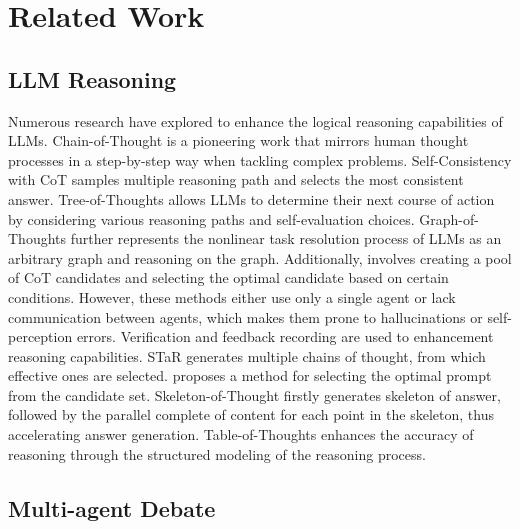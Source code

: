 \section{Related Work}
\label{sec:related-work}

\subsection{LLM Reasoning}

Numerous research have explored to enhance the logical reasoning capabilities of LLMs. Chain-of-Thought \cite{wei2023chainofthought} is a pioneering work that mirrors human thought processes in a step-by-step way when tackling complex problems. Self-Consistency with CoT \cite{wang2023selfconsistency} samples multiple reasoning path and selects the most consistent answer. Tree-of-Thoughts \cite{yao2024tree} allows LLMs to determine their next course of action by considering various reasoning paths and self-evaluation choices. Graph-of-Thoughts \cite{besta2024graph} further represents the nonlinear task resolution process of LLMs as an arbitrary graph and reasoning on the graph. 
Additionally, \cite{shum2023automatic} involves creating a pool of CoT candidates and selecting the optimal candidate based on certain conditions. However, these methods either use only a single agent or lack communication between agents, which makes them prone to hallucinations or self-perception errors.
Verification \cite{lightman2023lets} and feedback recording are used to enhancement reasoning capabilities. 
STaR \cite{eric2022star} generates multiple chains of thought, from which effective ones are selected.
\cite{zhou2022large} proposes a method for selecting the optimal prompt from the candidate set. 
Skeleton-of-Thought \cite{ning2023skeleton} firstly generates skeleton of answer, followed by the parallel complete of content for each point in the skeleton, thus accelerating answer generation. Table-of-Thoughts \cite{jin2023tab} enhances the accuracy of reasoning through the structured modeling of the reasoning process.

\subsection{Multi-agent Debate}


